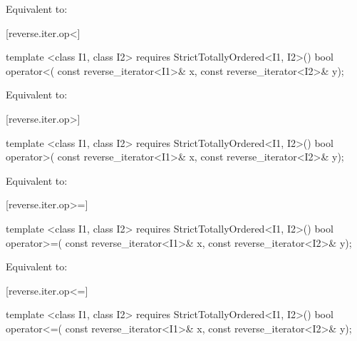 \begin{itemdescr}
\pnum
\effects Equivalent to:
\end{itemdescr}

[reverse.iter.op<]{}

%
\begin{itemdecl}
template <class I1, class I2>
    requires StrictTotallyOrdered<I1, I2>()
  bool operator<(
    const reverse_iterator<I1>& x,
    const reverse_iterator<I2>& y);
\end{itemdecl}

\begin{itemdescr}
\pnum
\effects Equivalent to:
\end{itemdescr}

[reverse.iter.op>]{}

%
\begin{itemdecl}
template <class I1, class I2>
    requires StrictTotallyOrdered<I1, I2>()
  bool operator>(
    const reverse_iterator<I1>& x,
    const reverse_iterator<I2>& y);
\end{itemdecl}

\begin{itemdescr}
\pnum
\effects Equivalent to:
\end{itemdescr}

[reverse.iter.op>=]{}

%
\begin{itemdecl}
template <class I1, class I2>
    requires StrictTotallyOrdered<I1, I2>()
  bool operator>=(
    const reverse_iterator<I1>& x,
    const reverse_iterator<I2>& y);
\end{itemdecl}

\begin{itemdescr}
\pnum
\effects Equivalent to:
\end{itemdescr}

[reverse.iter.op<=]{}

%
\begin{itemdecl}
template <class I1, class I2>
    requires StrictTotallyOrdered<I1, I2>()
  bool operator<=(
    const reverse_iterator<I1>& x,
    const reverse_iterator<I2>& y);
\end{itemdecl}

